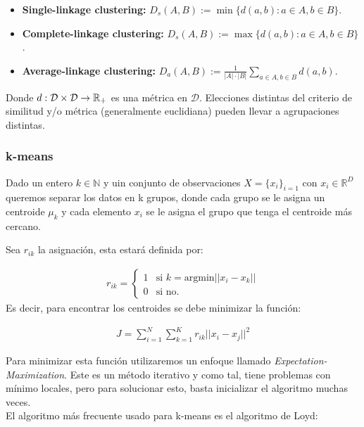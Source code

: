 \begin{itemize}
	\item \textbf{Single-linkage clustering:} $D_s(A,B):=\min\{d(a,b):a\in A, b\in B\}$.
	\item \textbf{Complete-linkage clustering:} $D_s(A,B):=\max\{d(a,b):a\in A, b\in B\}$.
	\item \textbf{Average-linkage clustering:} $D_a(A,B):=\frac{1}{|A|\cdot|B|}\sum_{a\in A, b\in B} d(a,b)$.
\end{itemize}

Donde $d:\mathcal{D}\times \mathcal{D}\to \mathbb{R}_+$ es una métrica en $\mathcal{D}$. Elecciones distintas del criterio de similitud y/o métrica (generalmente euclidiana) pueden llevar a agrupaciones distintas.

\subsubsection{k-means}
Dado un entero $k \in \mathbb{N}$ y uin conjunto de observaciones $X = \{x_i\}_{i=1}$ con $x_i\in \mathbb{R}^D$ queremos separar los datos en k grupos, donde cada grupo se le asigna un centroide $\mu_k$ y cada elemento $x_i$ se le asigna el grupo que tenga el centroide más cercano.

Sea $r_{ik}$ la asignación, esta estará definida por:

\begin{align}
r_{ik} = \begin{cases}
1 & \text{si } k = \text{argmin}||x_i-x_k||\\
0 & \text{si no.}
\end{cases}
\end{align}
Es decir, para encontrar los centroides se debe minimizar la función:

\begin{align}
J = \sum_{i=1}^N \sum_{k=1}^K r_{ik} ||x_i-x_j||^2
\end{align}

Para minimizar esta función utilizaremos un enfoque llamado \emph{Expectation-Maximization}. Este es un método iterativo y como tal, tiene problemas con mínimo locales, pero para solucionar esto, basta inicializar el algoritmo muchas veces.\\

El algoritmo más frecuente usado para k-means es el algoritmo de Loyd:

